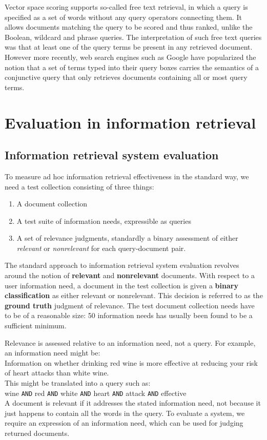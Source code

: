 \documentclass[letterpaper,11pt]{article}
\newcommand{\code}[1]{\texttt{#1}}
\begin{document}
Vector space scoring supports so-called free text retrieval, in which a query is specified as a set of words without any query operators connecting them. It allows documents matching the query to be scored and thus ranked, unlike the Boolean, wildcard and phrase queries. The interpretation of such free text queries was that at least one of the query terms be present in any retrieved document. However more recently, web search engines such as Google have popularized the notion that a set of terms typed into their query boxes carries the semantics of a conjunctive query that only retrieves documents containing all or most query terms.

\section{Evaluation in information retrieval}
\subsection{Information retrieval system evaluation}
To measure ad hoc information retrieval effectiveness in the standard way, we need a test collection consisting of three things:
\begin{enumerate}
    \item A document collection
    \item A test suite of information needs, expressible as queries
    \item A set of relevance judgments, standardly a binary assessment of either \textit{relevant} or \textit{nonrelevant} for each query-document pair.
\end{enumerate}
The standard approach to information retrieval system evaluation revolves around the notion of \textbf{relevant} and \textbf{nonrelevant} documents. With respect to a
user information need, a document in the test collection is given a \textbf{binary classification} as either relevant or nonrelevant. This decision is referred to as the \textbf{ground truth} judgment of relevance. The test document collection needs have to be of a reasonable size: 50 information needs has usually been found to be a sufficient minimum.

Relevance is assessed relative to an information need, not a query. For example, an information need might be:
\medskip\\
\indent Information on whether drinking red wine is more effective at reducing your risk of heart attacks than white wine.
\medskip\\
This might be translated into a query such as:
\medskip\\
\indent wine \code{AND} red \code{AND} white \code{AND} heart \code{AND} attack \code{AND} effective
\medskip\\
A document is relevant if it addresses the stated information need, not because it just happens to contain all the words in the query. To evaluate a system, we require an expression of an information need, which can be used for judging returned documents.
\end{document}
